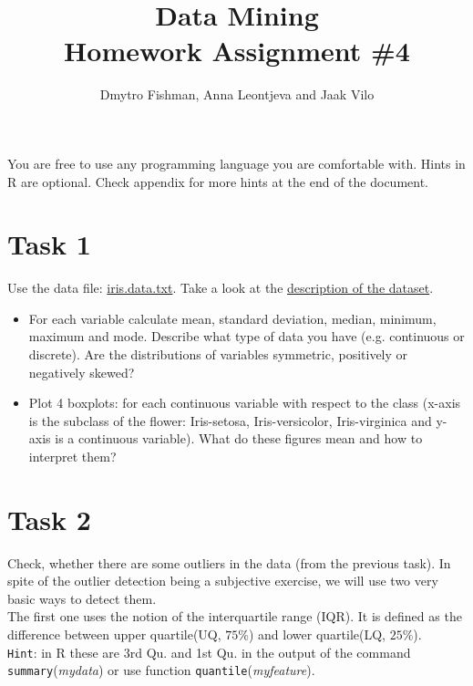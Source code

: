 \documentclass{article}
\title{Data Mining\\Homework Assignment \#4} %
\author{Dmytro Fishman, Anna Leontjeva and Jaak Vilo} %
\begin{document}
\maketitle %

You are free to use any programming language you are comfortable with. Hints in R are optional. Check appendix for more hints at the end of the document.


\section*{Task 1}
Use the data file: \href{http://www0.cs.ucl.ac.uk/staff/m.herbster/GI07/week4/iris.data.txt}{iris.data.txt}. Take a look at the \href{http://archive.ics.uci.edu/ml/datasets/Iris}{description of the dataset}. 
\begin{itemize}
\item For each variable calculate mean, standard deviation, median, minimum, maximum and mode. Describe what type of data you have (e.g. continuous or discrete). Are the distributions of variables symmetric, positively or negatively skewed?
\item Plot 4 boxplots: for each continuous variable with respect to the class (x-axis is the subclass of the flower: Iris-setosa, Iris-versicolor, Iris-virginica and y-axis is a continuous variable). What do these figures mean and how to interpret them? 
\end{itemize}
\section*{Task 2}
Check, whether there are some outliers in the data (from the previous task). In spite of the outlier detection being a subjective exercise, we will use two very basic ways to detect them. 
\\
The first one uses the notion of the interquartile range (IQR). It is defined as the difference between upper quartile(UQ, $75\%$) and lower quartile(LQ, $25\%$).\\ 
\texttt{Hint}: in R these are 3rd Qu. and 1st Qu. in the output of the command \texttt{summary}(\emph{mydata}) or use function \texttt{quantile}(\emph{myfeature}).\\ 
\end{document}
